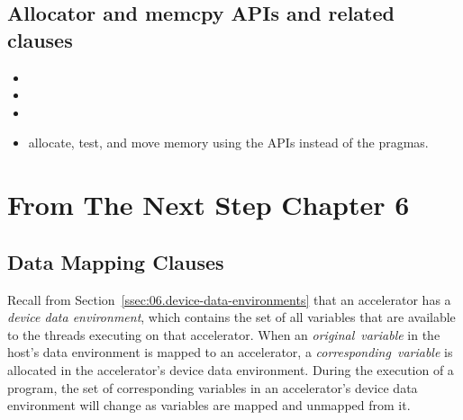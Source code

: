 \subsection{Allocator and memcpy APIs and related clauses}
\label{sec:alloc_apis}
\begin{itemize}
  \item {}
  \item {}
  \item {}
  \item allocate, test, and move memory using the APIs instead of the pragmas.
\end{itemize}


\section{From The Next Step Chapter 6}
\subsection{Data Mapping Clauses}
\label{sec:06.data-mapping-clauses}

Recall from Section~\ref{ssec:06.device-data-environments} that an accelerator has a
\emph{device data environment}, which contains the set of all variables that are
available to the threads executing on that accelerator.  When an 
\emph{original}~\emph{variable} in the host's data environment is mapped to an accelerator, a
\emph{corresponding}~\emph{variable} is allocated in the accelerator's device data
environment.  During the execution of a program, the set of corresponding
variables in an accelerator's device data environment will change as variables
are mapped and unmapped from it.


